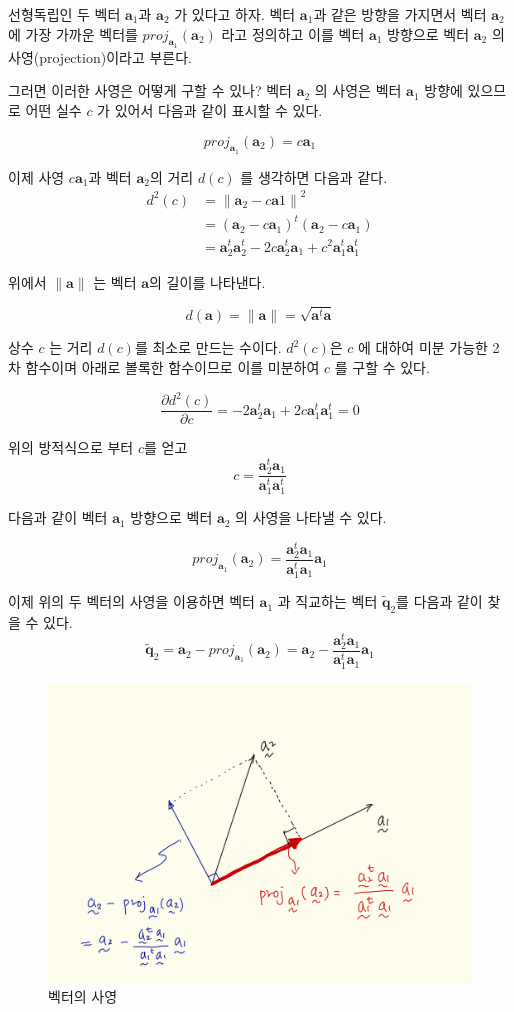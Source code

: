 \documentclass[
  10pt,
]{book}
\newcommand{\pardiff}[2]{\frac{\partial #1}{\partial #2 }}
\newcommand{\norm}[1]{\left\lVert#1\right\rVert}
\theoremstyle{definition}
\theoremstyle{definition}
\theoremstyle{definition}
\theoremstyle{definition}
\theoremstyle{remark}
\begin{document}
선형독립인 두 벡터 \(\bm a_1\)과 \(\bm a_2\) 가 있다고 하자. 벡터 \(\bm a_1\)과 같은 방향을 가지면서 벡터 \(\bm a_2\)에 가장 가까운 벡터를 \(proj_{\bm a_1} (\bm a_2)\) 라고 정의하고 이를 벡터 \(\bm a_1\) 방향으로 벡터 \(\bm a_2\) 의 사영(projection)이라고 부른다.

그러면 이러한 사영은 어떻게 구할 수 있나? 벡터 \(\bm a_2\) 의 사영은 벡터 \(\bm a_1\) 방향에 있으므로 어떤 실수 \(c\) 가 있어서 다음과 같이 표시할 수 있다.

\[ proj_{\bm a_1} (\bm a_2) =  c \bm a_1 \]

이제 사영 \(c \bm a_1\)과 벡터 \(\bm a_2\)의 거리 \(d(c)\) 를 생각하면 다음과 같다.
\begin{align*}
d^2(c) & = \norm{\bm a_2 - c \bm a1}^2 \\
   & = (\bm a_2 - c \bm a_1)^t(\bm a_2 - c \bm a_1) \\
   & = \bm a^t_2 \bm a^t_2 -2 c \bm a_2^t \bm a_1 + c^2 \bm a^t_1 \bm a^t_1
\end{align*}

위에서 \(\norm{\bm a}\) 는 벡터 \(\bm a\)의 길이를 나타낸다.

\[ d(\bm a) = \norm{\bm a} = \sqrt{\bm a^t \bm a} \]

상수 \(c\) 는 거리 \(d(c)\)를 최소로 만드는 수이다. \(d^2(c)\)은 \(c\) 에 대하여 미분 가능한 2차 함수이며 아래로 볼록한 함수이므로 이를 미분하여 \(c\) 를 구할 수 있다.

\[ \pardiff{d^2(c)}{c} = - 2\bm a_2^t \bm a_1 + 2c \bm a^t_1 \bm a^t_1 =0 \]

위의 방적식으로 부터 \(c\)를 얻고
\[ c= \frac{\bm a_2^t \bm a_1  }{\bm a^t_1 \bm a^t_1} \]

다음과 같이 벡터 \(\bm a_1\) 방향으로 벡터 \(\bm a_2\) 의 사영을 나타낼 수 있다.

\begin{equation} 
proj_{\bm a_1} (\bm a_2) = \frac{ \bm a_2^t \bm a_1} {\bm a_1^t \bm a_1} \bm a_1
\label{eq:proj1}
\end{equation}

이제 위의 두 벡터의 사영을 이용하면 벡터 \(\bm a_1\) 과 직교하는 벡터 \(\tilde {\bm q}_2\)를 다음과 같이 찾을 수 있다.
\[ \tilde {\bm q}_2 = \bm a_2 - proj_{\bm a_1} (\bm a_2) = \bm a_2 -  \frac{\bm a_2^t \bm a_1} {\bm a_1^t \bm a_1} \bm a_1 \]

\begin{figure}
\includegraphics[width=0.8\linewidth]{myimages/proj1} \caption{벡터의 사영}\label{fig:projection}
\end{figure}
\end{document}
